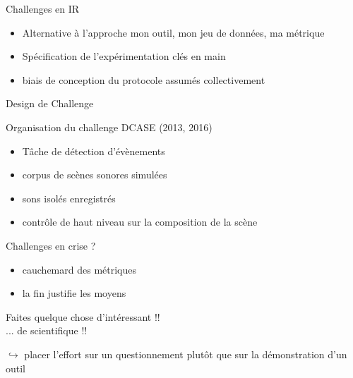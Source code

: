 \begin{frame}{Challenges en IR}
\begin{center}
\end{center}
\vspace{.8cm}
\begin{itemize}
\item Alternative à l'approche \og mon outil, mon jeu de données, ma métrique \fg
\item Spécification de l'expérimentation  \og clés en main \fg 
\item biais de conception du protocole assumés collectivement
\end{itemize}
\end{frame}

\begin{frame}{Design de Challenge}
\begin{block}{Organisation du challenge DCASE (2013, 2016)}
\begin{itemize}
\item Tâche de détection d'évènements
\item corpus de scènes sonores simulées
\item sons isolés enregistrés
\item contrôle de haut niveau sur la composition de la scène
\end{itemize}
\end{block} 
\end{frame}

\begin{frame}{Challenges en crise ?}
\begin{itemize}
    \item cauchemard des métriques
    \item \og la fin justifie les moyens \fg
\end{itemize}
\vspace{.8cm}
\begin{center}
\og Faites quelque chose d'intéressant !! \fg \\ 
\og ... de scientifique !! \fg
\end{center}
\vspace{.8cm}
$\hookrightarrow{}$ placer l'effort sur un questionnement plutôt que sur la démonstration d'un outil
\end{frame}


